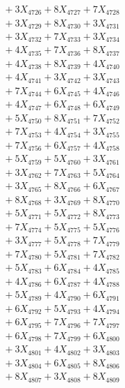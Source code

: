 \documentclass[a4paper,10pt]{article}
\begin{document}
{\begin{align}
&\;  + 3 X_{4726} + 8 X_{4727} + 7 X_{4728} \\[0.3ex]
&\;  + 3 X_{4729} + 8 X_{4730} + 3 X_{4731} \\[0.3ex]
&\;  + 3 X_{4732} + 7 X_{4733} + 3 X_{4734} \\[0.3ex]
&\;  + 4 X_{4735} + 7 X_{4736} + 8 X_{4737} \\[0.3ex]
&\;  + 4 X_{4738} + 8 X_{4739} + 4 X_{4740} \\[0.3ex]
&\;  + 4 X_{4741} + 3 X_{4742} + 3 X_{4743} \\[0.3ex]
&\;  + 7 X_{4744} + 6 X_{4745} + 4 X_{4746} \\[0.3ex]
&\;  + 4 X_{4747} + 6 X_{4748} + 6 X_{4749} \\[0.5ex]\allowbreak
&\;  + 5 X_{4750} + 8 X_{4751} + 7 X_{4752} \\[0.3ex]
&\;  + 7 X_{4753} + 4 X_{4754} + 3 X_{4755} \\[0.3ex]
&\;  + 7 X_{4756} + 6 X_{4757} + 4 X_{4758} \\[0.3ex]
&\;  + 5 X_{4759} + 5 X_{4760} + 3 X_{4761} \\[0.3ex]
&\;  + 3 X_{4762} + 7 X_{4763} + 5 X_{4764} \\[0.3ex]
&\;  + 3 X_{4765} + 8 X_{4766} + 6 X_{4767} \\[0.3ex]
&\;  + 8 X_{4768} + 3 X_{4769} + 8 X_{4770} \\[0.3ex]
&\;  + 5 X_{4771} + 5 X_{4772} + 8 X_{4773} \\[0.3ex]
&\;  + 7 X_{4774} + 5 X_{4775} + 5 X_{4776} \\[0.3ex]
&\;  + 3 X_{4777} + 5 X_{4778} + 7 X_{4779} \\[0.5ex]\allowbreak
&\;  + 7 X_{4780} + 5 X_{4781} + 7 X_{4782} \\[0.3ex]
&\;  + 5 X_{4783} + 6 X_{4784} + 4 X_{4785} \\[0.3ex]
&\;  + 4 X_{4786} + 6 X_{4787} + 4 X_{4788} \\[0.3ex]
&\;  + 5 X_{4789} + 4 X_{4790} + 6 X_{4791} \\[0.3ex]
&\;  + 6 X_{4792} + 5 X_{4793} + 4 X_{4794} \\[0.3ex]
&\;  + 6 X_{4795} + 7 X_{4796} + 7 X_{4797} \\[0.3ex]
&\;  + 6 X_{4798} + 7 X_{4799} + 6 X_{4800} \\[0.3ex]
&\;  + 3 X_{4801} + 4 X_{4802} + 3 X_{4803} \\[0.3ex]
&\;  + 3 X_{4804} + 6 X_{4805} + 8 X_{4806} \\[0.3ex]
&\;  + 8 X_{4807} + 3 X_{4808} + 8 X_{4809} \\[0.5ex]\allowbreak

\end{align}}
\end{document}

